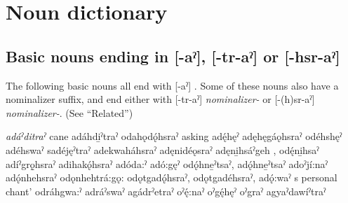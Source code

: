 \chapter{Noun dictionary} \label{ch:noun dictionary}
\section{Basic nouns ending in [-aˀ], [-tr-aˀ] or [-hsr-aˀ]} \label{ch:basic nouns ending in [-aˀ], [-tr-aˀ] or [-hsr-aˀ]}
The following basic nouns all end with [-aˀ] \textit{\nsf}. Some of these nouns also have a nominalizer suffix, and end either with  [-tr-aˀ] \textit{nominalizer-\nsf} or [-(h)sr-aˀ] \textit{nominalizer-\nsf}. (See “Related”)

\begin{multicols}{2}
 \textit{adáˀditraˀ} cane
 adáhdi̱ˀtraˀ 
 odahǫdǫ́hsraˀ asking
 adę́hęˀ 
 adęhęgáǫhsraˀ 
 odéhshęˀ 
 adéhswaˀ 
 sadéjęˀtraˀ 
 adekwaháhsraˀ 
 adęnidéǫsraˀ 
 adęni̱hsáˀgeh  , odę́ni̱hsaˀ 
 adíˀgrǫ̱hsraˀ 
 adihakǫ́hsraˀ 
 adóda:ˀ 
 adó:gęˀ 
 odǫ́hne̱ˀtsaˀ, adǫ́hne̱ˀtsaˀ 
 adoˀjí:naˀ 
 adǫ́nhehsraˀ 
 odǫnhehtrá:gǫ: 
 odǫtgadǫ́hsraˀ, odǫtgadéhsraˀ, 
 adǫ́:waˀ s personal chant’
 odráhgwa:ˀ 
 adráˀswaˀ 
 agádrˀetraˀ 
 oˀę́:naˀ 
 oˀgę́hęˀ 
 oˀgraˀ 
 agyaˀdawíˀtraˀ 

\end{multicols}
